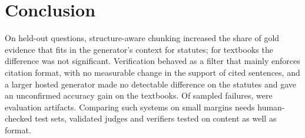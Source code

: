 \section{Conclusion}
\label{sec:conclusion}

On held-out questions, structure-aware chunking increased the share of gold evidence that fits in the generator's context for statutes; for textbooks the difference was not significant.
Verification behaved as a filter that mainly enforces citation format, with no measurable change in the support of cited sentences, and a larger hosted generator made no detectable difference on the statutes and gave an unconfirmed accuracy gain on the textbooks.
Of  sampled failures,  were evaluation artifacts.
Comparing such systems on small margins needs human-checked test sets, validated judges and verifiers tested on content as well as format.
